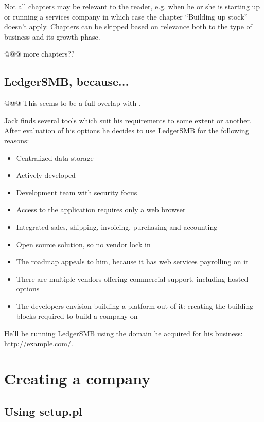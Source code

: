 Not all chapters may be relevant to the reader, e.g. when he or she is starting up or
running a services company in which case the chapter ``Building up stock'' doesn't apply.
Chapters can be skipped based on relevance both to the type of business and its growth
phase.

@@@ more chapters??

\section{LedgerSMB, because...}

@@@ This seems to be a full overlap with .

Jack finds several tools which suit his requirements to some extent or another.
After evaluation of his options he decides to use LedgerSMB for the following reasons:

\begin{itemize}
\item Centralized data storage
\item Actively developed
\item Development team with security focus
\item Access to the application requires only a web browser
\item Integrated sales, shipping, invoicing, purchasing and accounting
\item Open source solution, so no vendor lock in
\item The roadmap appeals to him, because it has web services payrolling on it
\item There are multiple vendors offering commercial support, including hosted options
\item The developers envision building a platform out of it: creating the building blocks
required to build a company on
\end{itemize}

He'll be running LedgerSMB using the domain he acquired for his business:
\url{http://example.com/}.

\chapter{Creating a company}
\label{cha:CompanyCreation}

\section{Using setup.pl}

